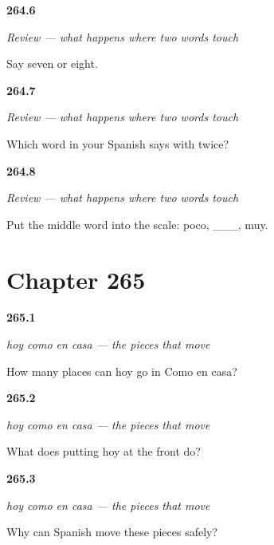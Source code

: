 \noindent\begin{minipage}[t]{\linewidth}
\raggedright
\hypertarget{review-ES-C67-repaso-cuando-dos-palabras-se-tocan-u}{\textbf{264.6}} \emph{Review — what happens where two words touch}\par
\small Say seven or eight.
\end{minipage}\par\medskip

\noindent\begin{minipage}[t]{\linewidth}
\raggedright
\hypertarget{review-ES-C67-repaso-cuando-dos-palabras-se-tocan-conmigo}{\textbf{264.7}} \emph{Review — what happens where two words touch}\par
\small Which word in your Spanish says with twice?
\end{minipage}\par\medskip

\noindent\begin{minipage}[t]{\linewidth}
\raggedright
\hypertarget{review-ES-C67-repaso-cuando-dos-palabras-se-tocan-grado}{\textbf{264.8}} \emph{Review — what happens where two words touch}\par
\small Put the middle word into the scale: poco, \_\_\_, muy.
\end{minipage}\par\medskip

\section*{Chapter 265}

\noindent\begin{minipage}[t]{\linewidth}
\raggedright
\hypertarget{review-ES-C67-hoy-como-en-casa-three}{\textbf{265.1}} \emph{hoy como en casa — the pieces that move}\par
\small How many places can hoy go in Como en casa?
\end{minipage}\par\medskip

\noindent\begin{minipage}[t]{\linewidth}
\raggedright
\hypertarget{review-ES-C67-hoy-como-en-casa-front}{\textbf{265.2}} \emph{hoy como en casa — the pieces that move}\par
\small What does putting hoy at the front do?
\end{minipage}\par\medskip

\noindent\begin{minipage}[t]{\linewidth}
\raggedright
\hypertarget{review-ES-C67-hoy-como-en-casa-why}{\textbf{265.3}} \emph{hoy como en casa — the pieces that move}\par
\small Why can Spanish move these pieces safely?
\end{minipage}\par\medskip

